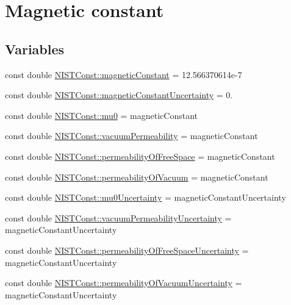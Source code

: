 \hypertarget{group___magnetic_constant}{}\section{Magnetic constant}
\label{group___magnetic_constant}
\subsection*{Variables}
\begin{DoxyCompactItemize}
\item 
const double \hyperlink{group___magnetic_constant_ga511860d1f2830ae6a85e1b1df8522071}{N\+I\+S\+T\+Const\+::magnetic\+Constant} = 12.\+566370614e-\/7
\item 
const double \hyperlink{group___magnetic_constant_ga17f91f2aa414afe44a0bc84825034a4e}{N\+I\+S\+T\+Const\+::magnetic\+Constant\+Uncertainty} = 0.
\item 
const double \hyperlink{group___magnetic_constant_gaee4806f14e9b0f48347b2d29ddcd2668}{N\+I\+S\+T\+Const\+::mu0} = magnetic\+Constant
\item 
const double \hyperlink{group___magnetic_constant_ga2bf51bbe9c6b75752250c9b133758223}{N\+I\+S\+T\+Const\+::vacuum\+Permeability} = magnetic\+Constant
\item 
const double \hyperlink{group___magnetic_constant_gad7321a170873a7532ecfb8383d827d1e}{N\+I\+S\+T\+Const\+::permeability\+Of\+Free\+Space} = magnetic\+Constant
\item 
const double \hyperlink{group___magnetic_constant_ga7210c41dfc8fb9dbc41c83282eafebc6}{N\+I\+S\+T\+Const\+::permeability\+Of\+Vacuum} = magnetic\+Constant
\item 
const double \hyperlink{group___magnetic_constant_ga8c9dd97d5f05e75e3eb2b2daaa0e1b7e}{N\+I\+S\+T\+Const\+::mu0\+Uncertainty} = magnetic\+Constant\+Uncertainty
\item 
const double \hyperlink{group___magnetic_constant_gaf9ad0468a42a06fab2ba9738f20aa68b}{N\+I\+S\+T\+Const\+::vacuum\+Permeability\+Uncertainty} = magnetic\+Constant\+Uncertainty
\item 
const double \hyperlink{group___magnetic_constant_gab95a7a90e35194a4d31736c375e57bde}{N\+I\+S\+T\+Const\+::permeability\+Of\+Free\+Space\+Uncertainty} = magnetic\+Constant\+Uncertainty
\item 
const double \hyperlink{group___magnetic_constant_gaa30d6a001f3d52ea07c50ff9c921c8e9}{N\+I\+S\+T\+Const\+::permeability\+Of\+Vacuum\+Uncertainty} = magnetic\+Constant\+Uncertainty
\end{DoxyCompactItemize}


